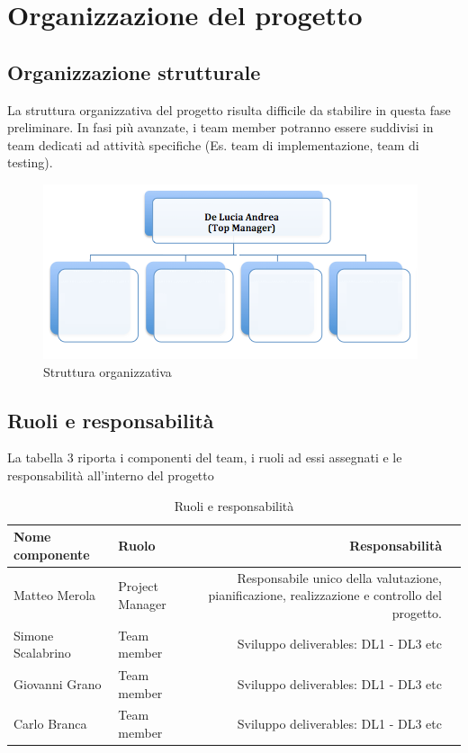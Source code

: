 \chapter{Organizzazione del progetto}	
		
		\section{Organizzazione strutturale}
		\label{sec:struc}
		
		La struttura organizzativa del progetto risulta difficile da stabilire in questa fase preliminare. In fasi più avanzate, i team member potranno essere suddivisi in team dedicati ad attività specifiche (Es. team di implementazione, team di testing).
		
		\begin{figure}
		\centering
		\includegraphics{img/organizzazione.png}
		\caption{Struttura organizzativa}\label{fig:1}
		\end{figure}
		
		
		\section{Ruoli e responsabilità}
		La tabella 3 riporta i componenti del team, i ruoli ad essi assegnati e le responsabilità all'interno del progetto
		
		\begin {table}[H]
		\begin{center}
			\begin{tabular}{|l|l|rl|}
				\hline
				Nome componente & Ruolo & Responsabilità\\
				\hline
				Matteo Merola & Project Manager & Responsabile unico della valutazione, pianificazione, realizzazione e controllo del progetto.\\
				\hline
				Simone Scalabrino & Team member & Sviluppo deliverables: DL1 - DL3 etc\\
				\hline
				Giovanni Grano & Team member & Sviluppo deliverables: DL1 - DL3 etc\\
				\hline
				Carlo Branca & Team member & Sviluppo deliverables: DL1 - DL3 etc \\
				\hline
			\end{tabular}
		\caption{Ruoli e responsabilità}\label{tab:3}
		\end{center}
		\end {table}
		